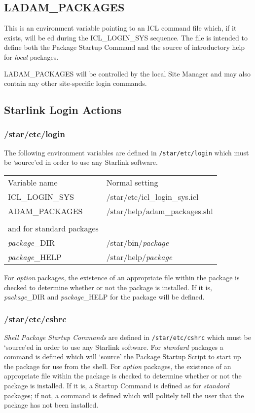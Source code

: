 \documentclass[twoside,11pt,nolof]{starlink}
\begin{document}
\subsection{LADAM\_PACKAGES}
\label{ladampacks}
This is an environment variable pointing to an ICL command file which,
if it exists, will be
ed during the ICL\_LOGIN\_SYS sequence.
The file is intended to define both the Package Startup Command and the source
of introductory help for \textit{local} packages.

LADAM\-\_PACKAGES will be controlled by the local Site Manager and
may also contain any other site-specific login commands.

\subsection{Starlink Login Actions}
\subsubsection{/star/etc/login}
The following environment variables are defined in \texttt{/star/etc/login}
which must be `source'ed in order to use any Starlink software.

\begin{tabular}{ll}
Variable name & Normal setting\\
ICL\_LOGIN\_SYS   & /star/etc/icl\_login\_sys.icl\\
ADAM\_PACKAGES & /star/help/adam\_packages.shl\\
\\
and for standard packages
\\
\textit{package}\_DIR & /star/bin/\textit{package}\\
\textit{package}\_HELP & /star/help/\textit{package}\\
\end{tabular}

For \textit{option} packages, the existence of an appropriate file within the
package is checked to determine whether or not the package is installed.
If it is, \textit{package}\_DIR and \textit{package}\_HELP for the package will
be defined.

\subsubsection{/star/etc/cshrc}
\textit{Shell Package Startup Commands} are defined in \texttt{/star/etc/cshrc}
which must be `source'ed in order to use any Starlink software.
For \textit{standard} packages a command is defined which will `source'
the Package Startup Script to start up the package for use from the shell.
For \textit{option} packages, the existence of an appropriate file within the
package is checked to determine whether or not the package is installed.
If it is, a Startup Command is defined as for \textit{standard}
packages;
if not, a command is defined which will politely tell the user that
the package has not been installed.
\end{document}
